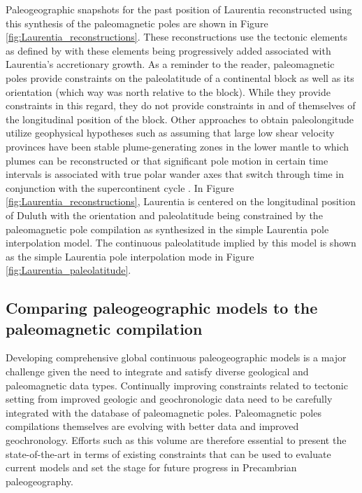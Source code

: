 \documentclass[11pt,letterpaper]{article}
\begin{document}
 Paleogeographic snapshots for the past position of Laurentia reconstructed using this synthesis of the paleomagnetic poles are shown in Figure \ref{fig:Laurentia_reconstructions}. These reconstructions use the tectonic elements as defined by \citet{Whitmeyer2007a} with these elements being progressively added associated with Laurentia's accretionary growth. As a reminder to the reader, paleomagnetic poles provide constraints on the paleolatitude of a continental block as well as its orientation (which way was north relative to the block). While they provide constraints in this regard, they do not provide constraints in and of themselves of the longitudinal position of the block. Other approaches to obtain paleolongitude utilize geophysical hypotheses such as assuming that large low shear velocity provinces have been stable plume-generating zones in the lower mantle to which plumes can be reconstructed \citep{Torsvik2014a} or that significant pole motion in certain time intervals is associated with true polar wander axes that switch through time in conjunction with the supercontinent cycle \citep{Mitchell2012a}. In Figure \ref{fig:Laurentia_reconstructions}, Laurentia is centered on the longitudinal position of Duluth with the orientation and paleolatitude being constrained by the paleomagnetic pole compilation as synthesized in the simple Laurentia pole interpolation model. The continuous paleolatitude implied by this model is shown as the simple Laurentia pole interpolation mode in Figure \ref{fig:Laurentia_paleolatitude}.

\subsection{Comparing paleogeographic models to the paleomagnetic compilation}

Developing comprehensive global continuous paleogeographic models is a major challenge given the need to integrate and satisfy diverse geological and paleomagnetic data types. Continually improving constraints related to tectonic setting from improved geologic and geochronologic data need to be carefully integrated with the database of paleomagnetic poles. Paleomagnetic poles compilations themselves are evolving with better data and improved geochronology. Efforts such as this volume are therefore essential to present the state-of-the-art in terms of existing constraints that can be used to evaluate current models and set the stage for future progress in Precambrian paleogeography.
\end{document}
